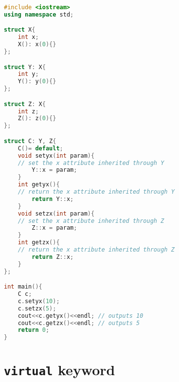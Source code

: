 \documentclass[10pt,\jkfside,a4paper]{article}
\begin{document}
\begin{lstlisting}[language=C++]
#include <iostream>
using namespace std;

struct X{
    int x;
    X(): x(0){}
};

struct Y: X{
    int y;
    Y(): y(0){}
};

struct Z: X{
    int z;
    Z(): z(0){}
};

struct C: Y, Z{
    C()= default;
    void setyx(int param){
    // set the x attribute inherited through Y
        Y::x = param;
    }
    int getyx(){
    // return the x attribute inherited through Y
        return Y::x;
    }
    void setzx(int param){
    // set the x attribute inherited through Z
        Z::x = param;
    }
    int getzx(){
    // return the x attribute inherited through Z
        return Z::x;
    }
};

int main(){
    C c;
    c.setyx(10);
    c.setzx(5);
    cout<<c.getyx()<<endl; // outputs 10
    cout<<c.getzx()<<endl; // outputs 5
    return 0;
}

\end{lstlisting}

\section{\texttt{virtual} keyword}
\end{document}
